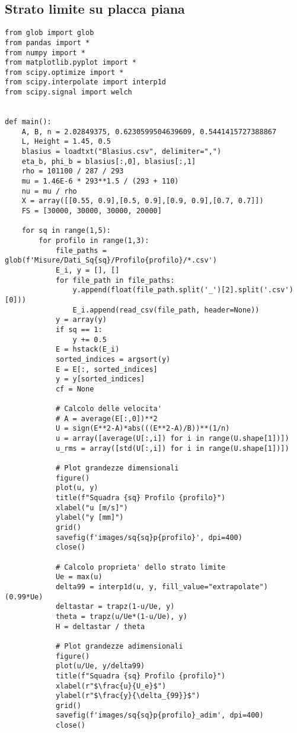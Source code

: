 \subsection{Strato limite su placca piana}\label{b9}
\begin{lstlisting}
from glob import glob
from pandas import *
from numpy import *
from matplotlib.pyplot import *
from scipy.optimize import *
from scipy.interpolate import interp1d
from scipy.signal import welch


def main():
    A, B, n = 2.02849375, 0.6230599504639609, 0.5441415727388867
    L, Height = 1.45, 0.5
    blasius = loadtxt("Blasius.csv", delimiter=",")
    eta_b, phi_b = blasius[:,0], blasius[:,1]
    rho = 101100 / 287 / 293
    mu = 1.46E-6 * 293**1.5 / (293 + 110)
    nu = mu / rho
    X = array([[0.55, 0.9],[0.5, 0.9],[0.9, 0.9],[0.7, 0.7]])
    FS = [30000, 30000, 30000, 20000]

    for sq in range(1,5):
        for profilo in range(1,3):
            file_paths = glob(f'Misure/Dati_Sq{sq}/Profilo{profilo}/*.csv')
            E_i, y = [], []
            for file_path in file_paths:
                y.append(float(file_path.split('_')[2].split('.csv')[0]))
                E_i.append(read_csv(file_path, header=None))
            y = array(y)
            if sq == 1:
                y += 0.5
            E = hstack(E_i)
            sorted_indices = argsort(y)
            E = E[:, sorted_indices]
            y = y[sorted_indices]
            cf = None

            # Calcolo delle velocita'
            # A = average(E[:,0])**2
            U = sign(E**2-A)*abs(((E**2-A)/B))**(1/n)
            u = array([average(U[:,i]) for i in range(U.shape[1])])
            u_rms = array([std(U[:,i]) for i in range(U.shape[1])])

            # Plot grandezze dimensionali
            figure()
            plot(u, y)
            title(f"Squadra {sq} Profilo {profilo}")
            xlabel("u [m/s]")
            ylabel("y [mm]")
            grid()
            savefig(f'images/sq{sq}p{profilo}', dpi=400)
            close()

            # Calcolo proprieta' dello strato limite
            Ue = max(u)
            delta99 = interp1d(u, y, fill_value="extrapolate")(0.99*Ue)
            deltastar = trapz(1-u/Ue, y)
            theta = trapz(u/Ue*(1-u/Ue), y)
            H = deltastar / theta

            # Plot grandezze adimensionali
            figure()
            plot(u/Ue, y/delta99)
            title(f"Squadra {sq} Profilo {profilo}")
            xlabel(r"$\frac{u}{U_e}$")
            ylabel(r"$\frac{y}{\delta_{99}}$")
            grid()
            savefig(f'images/sq{sq}p{profilo}_adim', dpi=400)
            close()


\end{lstlisting}
